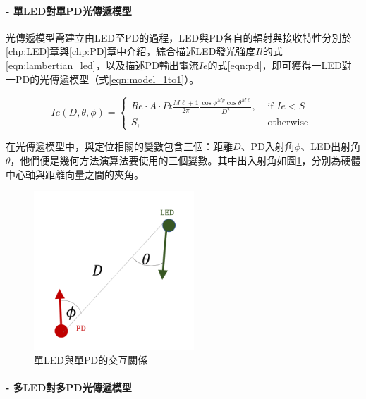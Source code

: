    \paragraph*{- 單LED對單PD光傳遞模型}

        \hfill
    
        光傳遞模型需建立由LED至PD的過程，LED與PD各自的輻射與接收特性分別於\ref{chp:LED}章與\ref{chp:PD}章中介紹，綜合描述LED發光強度$Il$的式\ref{eqn:lambertian_led}，以及描述PD輸出電流$Ie$的式\ref{eqn:pd}，即可獲得一LED對一PD的光傳遞模型（式\ref{eqn:model_1to1}）。
    
        \begin{equation}
            \label{eqn:model_1to1}
            Ie(D,\theta,\phi) = \begin{cases}Re \cdot A\cdot Pt\frac{M\ell+1}{2\pi}\frac{\cos \phi^{Mp}\cos \theta^{M\ell}}{D^2}, & \text { if } Ie<S \\ S, & \text { otherwise }\end{cases}
        \end{equation}
    
        在光傳遞模型中，與定位相關的變數包含三個：距離$D$、PD入射角$\phi$、LED出射角$\theta$，他們便是幾何方法演算法要使用的三個變數。其中出入射角如圖\ref{pic:interactive_1to1}，分別為硬體中心軸與距離向量之間的夾角。
    
        \begin{figure}[htpb]
            \centering
            \includegraphics[width=6cm]{ch2pic/interactive_1to1.png}
            \caption{單LED與單PD的交互關係}
            \label{pic:interactive_1to1}
        \end{figure}

        \paragraph*{- 多LED對多PD光傳遞模型}

